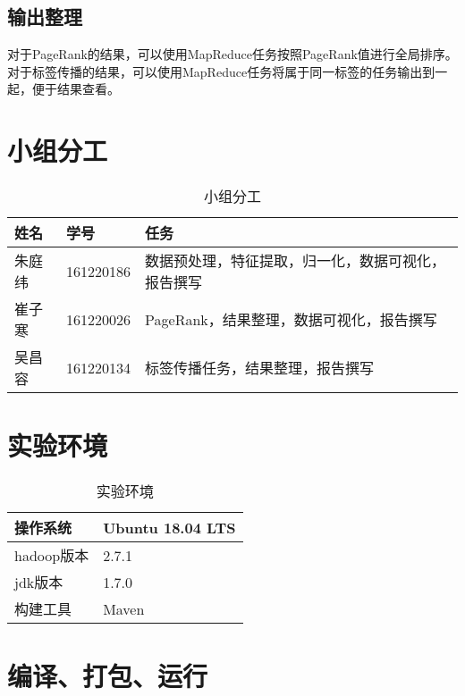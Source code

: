 \subsection{输出整理}
对于PageRank的结果，可以使用MapReduce任务按照PageRank值进行全局排序。\\
对于标签传播的结果，可以使用MapReduce任务将属于同一标签的任务输出到一起，便于结果查看。
\section{小组分工}
\begin{table}[!htbp]
	\centering
	\caption{小组分工}
	\begin{tabular} {|p{50pt}|p{80pt}|p{250pt}|}
		\hline
		姓名& 学号 &任务\\
		\hline
		朱庭纬&161220186&数据预处理，特征提取，归一化，数据可视化，报告撰写\\
		\hline
		崔子寒&161220026&PageRank，结果整理，数据可视化，报告撰写\\
		\hline
		吴昌容&161220134&标签传播任务，结果整理，报告撰写\\
		\hline
	\end{tabular}
\end{table}
\section{实验环境}
\begin{table}[!htbp]
	\centering
	\caption{实验环境}
	\begin{tabular} {|p{80pt}|p{160pt}|}
		\hline
		操作系统&Ubuntu 18.04 LTS\\
		\hline
		hadoop版本& 2.7.1\\
		\hline
		jdk版本& 1.7.0\\
		\hline
		构建工具&Maven\\
		\hline
	\end{tabular}
\end{table}
\section{编译、打包、运行}

